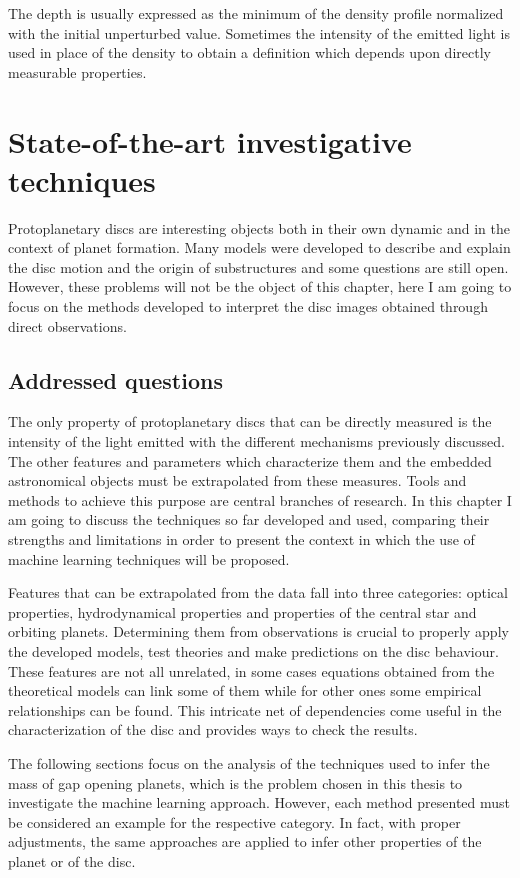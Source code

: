 \documentclass[a4paper,10pt]{report}
\begin{document}
The depth is usually expressed as the minimum of the density profile normalized with the initial unperturbed value. Sometimes the intensity of the emitted light is used in place of the
density to obtain a definition which depends upon directly measurable properties.

\chapter{State-of-the-art investigative techniques}

Protoplanetary discs are interesting objects both in their own dynamic and
in the context of planet formation.
Many models were developed to describe and explain the disc motion and the origin of substructures and
some questions are still open. However, these problems will not be the object of this chapter, 
here I am going to focus on the methods developed to interpret the
disc images obtained through direct observations.

\section{Addressed questions}


The only property of protoplanetary discs that can be directly measured
is the intensity of the light emitted with the different mechanisms previously discussed.
The other features and parameters which characterize them and the embedded astronomical objects
must be extrapolated from these measures. 
Tools and methods to achieve this purpose are central branches of research. In this chapter I am going to discuss
the techniques so far developed and used, comparing their strengths and limitations in order to present the context
in which the use of machine learning techniques will be proposed.


Features that can be extrapolated from the data fall into three categories: optical properties, hydrodynamical properties
and properties of the central star and orbiting planets.
Determining them from observations is crucial
to properly apply the developed models, test theories and make predictions on the disc behaviour.
These features are not all unrelated, in some cases equations obtained from the theoretical
models can link some of them while for other ones some empirical relationships can be found.
This intricate net of dependencies come useful in the characterization of the disc and provides 
ways to check the results.

The following sections focus on the analysis of the
techniques used to infer the mass of gap opening planets, which is
the problem chosen in this thesis to investigate the machine learning approach.
However, each method presented must be considered an example for the respective category. 
In fact, with proper adjustments, the same approaches are
applied to infer other properties of the planet or of the disc.
\end{document}
